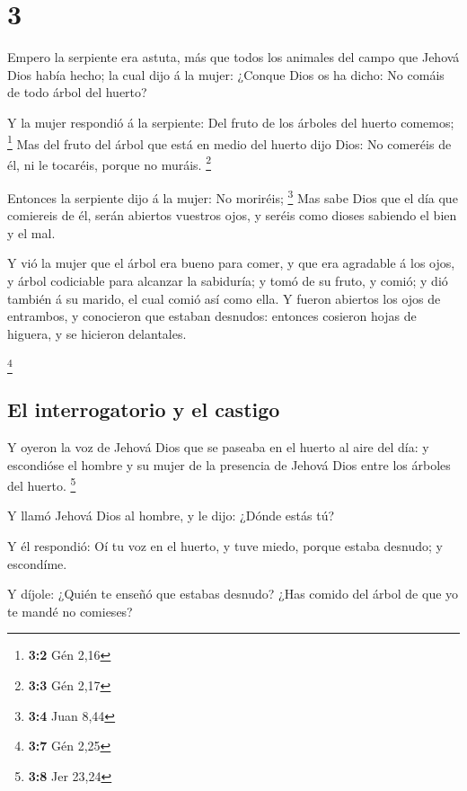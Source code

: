 \hypertarget{section-2}{%
\section{3}\label{section-2}}

 Empero la serpiente era astuta, más que todos los animales
del campo que Jehová Dios había hecho; la cual dijo á la mujer: ¿Conque
Dios os ha dicho: No comáis de todo árbol del huerto?

 Y la mujer respondió á la serpiente: Del fruto de los
árboles del huerto comemos; \footnote{\textbf{3:2} Gén 2,16}
 Mas del fruto del árbol que está en medio del huerto dijo
Dios: No comeréis de él, ni le tocaréis, porque no muráis. \footnote{\textbf{3:3}
  Gén 2,17}

 Entonces la serpiente dijo á la mujer: No moriréis;
\footnote{\textbf{3:4} Juan 8,44}  Mas sabe Dios que el día
que comiereis de él, serán abiertos vuestros ojos, y seréis como dioses
sabiendo el bien y el mal.

 Y vió la mujer que el árbol era bueno para comer, y que era
agradable á los ojos, y árbol codiciable para alcanzar la sabiduría; y
tomó de su fruto, y comió; y dió también á su marido, el cual comió así
como ella.  Y fueron abiertos los ojos de entrambos, y
conocieron que estaban desnudos: entonces cosieron hojas de higuera, y
se hicieron delantales.

\footnote{\textbf{3:7} Gén 2,25}

\hypertarget{el-interrogatorio-y-el-castigo}{%
\subsection{El interrogatorio y el
castigo}\label{el-interrogatorio-y-el-castigo}}

 Y oyeron la voz de Jehová Dios que se paseaba en el huerto
al aire del día: y escondióse el hombre y su mujer de la presencia de
Jehová Dios entre los árboles del huerto. \footnote{\textbf{3:8} Jer
  23,24}

 Y llamó Jehová Dios al hombre, y le dijo: ¿Dónde estás tú?

 Y él respondió: Oí tu voz en el huerto, y tuve miedo,
porque estaba desnudo; y escondíme.

 Y díjole: ¿Quién te enseñó que estabas desnudo? ¿Has
comido del árbol de que yo te mandé no comieses?

